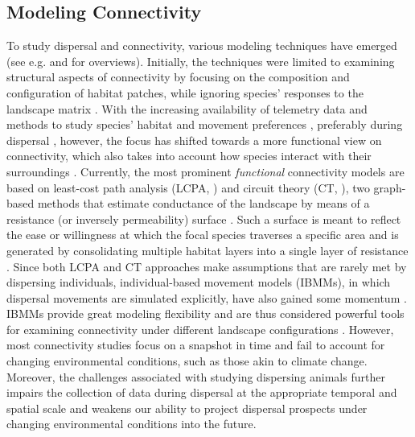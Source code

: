 \documentclass[abstract=on,10pt,a4paper,bibliography=totocnumbered]{article}
\begin{document}
\subsection{Modeling Connectivity}
To study dispersal and connectivity, various modeling techniques have emerged
(see e.g. \citealp{Etherington.2016} and \citealp{Diniz.2019} for overviews).
Initially, the techniques were limited to examining structural aspects of
connectivity by focusing on the composition and configuration of habitat
patches, while ignoring species' responses to the landscape matrix
\citep{Tischendorf.2000, Doerr.2011}. With the increasing availability of
telemetry data and methods to study species' habitat and movement preferences
\citep{Boyce.2002, Fortin.2009, Cushman.2010, Avgar.2016}, preferably during
dispersal \citep{Elliot.2014}, however, the focus has shifted towards a more
functional view on connectivity, which also takes into account how species
interact with their surroundings \citep{Tischendorf.2000, Doerr.2011}.
Currently, the most prominent \textit{functional} connectivity models are based
on least-cost path analysis (LCPA, \citealp{Adriaensen.2003}) and circuit theory
(CT, \citealp{McRae.2008}), two graph-based methods that estimate conductance of
the landscape by means of a resistance (or inversely permeability) surface
\citep{Zeller.2012}. Such a surface is meant to reflect the ease or willingness
at which the focal species traverses a specific area and is generated by
consolidating multiple habitat layers into a single layer of resistance
\citep{Zeller.2012}. Since both LCPA and CT approaches make assumptions that are
rarely met by dispersing individuals, individual-based movement models (IBMMs),
in which dispersal movements are simulated explicitly, have also gained some
momentum \citep{Kanagaraj.2013, Allen.2016, Hauenstein.2019, Diniz.2019,
 Zeller.2020, UnnithanKumar.2022, UnnithanKumar.2022a, Hofmann.2023}. IBMMs
provide great modeling flexibility and are thus considered powerful tools for
examining connectivity under different landscape configurations
\citep{Littlefield.2019, UnnithanKumar.2022a}. However, most connectivity
studies focus on a snapshot in time and fail to account for changing
environmental conditions, such as those akin to climate change. Moreover, the
challenges associated with studying dispersing animals further impairs the
collection of data during dispersal at the appropriate temporal and spatial
scale \citep{Graves.2014, Vasudev.2015} and weakens our ability to project
dispersal prospects under changing environmental conditions into the future.
\end{document}
